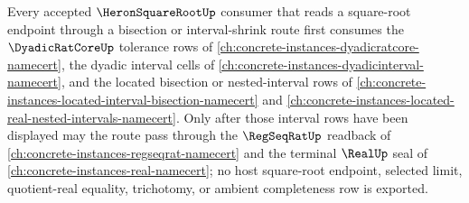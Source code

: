 Every accepted $\HeronSquareRootUp$ consumer that reads a square-root endpoint through a bisection or interval-shrink route first consumes the $\DyadicRatCoreUp$ tolerance rows of \autoref{ch:concrete-instances-dyadicratcore-namecert}, the dyadic interval cells of \autoref{ch:concrete-instances-dyadicinterval-namecert}, and the located bisection or nested-interval rows of \autoref{ch:concrete-instances-located-interval-bisection-namecert} and \autoref{ch:concrete-instances-located-real-nested-intervals-namecert}. Only after those interval rows have been displayed may the route pass through the $\RegSeqRatUp$ readback of \autoref{ch:concrete-instances-regseqrat-namecert} and the terminal $\RealUp$ seal of \autoref{ch:concrete-instances-real-namecert}; no host square-root endpoint, selected limit, quotient-real equality, trichotomy, or ambient completeness row is exported.

